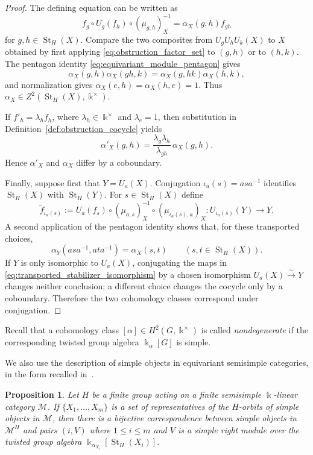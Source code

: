 \documentclass[12pt]{amsart}
\theoremstyle{plain}
\newtheorem{proposition}[theorem]{Proposition}
\theoremstyle{definition} %
\theoremstyle{remark} %
\newcommand{\ku}{{\Bbbk}} %
\newcommand{\cM}{\mathcal{M}}
\newcommand{\St}{\operatorname{St}}
\begin{document}
\begin{proof}
The defining equation can be written as
\begin{equation}\label{eq:obstruction_factor_set}
f_g\circ U_g(f_h)\circ(\mu_{g,h})_X^{-1}
=\alpha_X(g,h)f_{gh}
\end{equation}
for $g,h\in\St_H(X)$. Compare the two composites from
$U_gU_hU_k(X)$ to $X$ obtained by first applying
\eqref{eq:obstruction_factor_set} to $(g,h)$ or to $(h,k)$. The pentagon identity
\eqref{eq:equivariant_module_pentagon} gives
\[
\alpha_X(g,h)\alpha_X(gh,k)
=\alpha_X(g,hk)\alpha_X(h,k),
\]
and normalization gives $\alpha_X(e,h)=\alpha_X(h,e)=1$. Thus
$\alpha_X\in Z^2(\St_H(X),\ku^\times)$.

If $f'_h=\lambda_hf_h$, where $\lambda_h\in\ku^\times$ and
$\lambda_e=1$, then substitution in Definition~\ref{def:obstruction_cocycle} yields
\[
\alpha'_X(g,h)
=\frac{\lambda_g\lambda_h}{\lambda_{gh}}\,\alpha_X(g,h).
\]
Hence $\alpha'_X$ and $\alpha_X$ differ by a coboundary.

Finally, suppose first that $Y=U_a(X)$. Conjugation
$\iota_a(s)=asa^{-1}$ identifies $\St_H(X)$ with $\St_H(Y)$. For
$s\in\St_H(X)$ define
\begin{equation}\label{eq:transported_stabilizer_isomorphism}
\widetilde f_{\iota_a(s)}
:=U_a(f_s)\circ(\mu_{a,s})_X^{-1}
\circ(\mu_{\iota_a(s),a})_X:
U_{\iota_a(s)}(Y)\longrightarrow Y.
\end{equation}
A second application of the pentagon identity shows that, for these transported choices,
\[
\alpha_Y(asa^{-1},ata^{-1})=\alpha_X(s,t)
\qquad(s,t\in\St_H(X)).
\]
If $Y$ is only isomorphic to $U_a(X)$, conjugating the maps in
\eqref{eq:transported_stabilizer_isomorphism} by a chosen isomorphism
$U_a(X)\xrightarrow{\sim}Y$ changes neither conclusion; a different choice changes the cocycle only by a coboundary. Therefore the two cohomology classes correspond under conjugation.
\end{proof}

Recall that a cohomology class $[\alpha] \in H^2(G, \ku^\times)$ is called \emph{nondegenerate} if the corresponding twisted group algebra $\ku_\alpha[G]$ is simple.

We also use the description of simple objects in equivariant semisimple categories, in the form recalled in~\cite[Subsection~7.5.1]{GP17}.

\begin{proposition}\label{prop:structure_MH}
Let $H$ be a finite group acting on a finite semisimple $\ku$-linear category $\cM$. If $\{X_1, \ldots, X_m\}$ is a set of representatives of the $H$-orbits of simple objects in $\cM$, then there is a bijective correspondence between simple objects in $\cM^H$ and pairs $(i, V)$ where $1 \leq i \leq m$ and $V$ is a simple right module over the twisted group algebra $\ku_{\alpha_{X_i}}[\St_H(X_i)]$.
\end{proposition}
\end{document}
